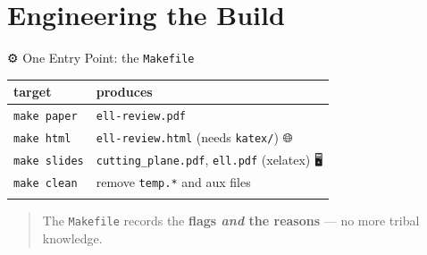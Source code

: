 \documentclass[
  10pt,
  ignorenonframetext,
  serif,
  aspectratio=169]{beamer}
\newenvironment{Shaded}{}{}
\newcommand{\NormalTok}[1]{#1}
\newcounter{none} %
\begin{document}
\section{Engineering the Build}\label{engineering-the-build}

\begin{frame}[fragile]{⚙️ One Entry Point: the \texttt{Makefile}}
\protect{}\label{one-entry-point-the-makefile}
{\def\LTcaptype{none} %
\begin{longtable}[]{@{}ll@{}}
\toprule\noalign{}
target & produces \\
\midrule\noalign{}
\endhead
\texttt{make\ paper} & \texttt{ell-review.pdf} 📕 \\
\texttt{make\ html} & \texttt{ell-review.html} (needs \texttt{katex/})
🌐 \\
\texttt{make\ slides} & \texttt{cutting\_plane.pdf}, \texttt{ell.pdf}
(xelatex) 🖥️ \\
\texttt{make\ clean} & remove \texttt{temp.*} and aux files 🧹 \\
\bottomrule\noalign{}
\end{longtable}
}

\begin{Shaded}
\end{Shaded}

\begin{quote}
The \texttt{Makefile} records the \textbf{flags \emph{and} the reasons}
--- no more tribal knowledge. 📌
\end{quote}
\end{frame}
\end{document}
